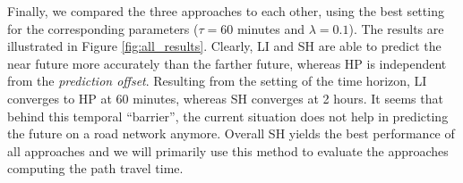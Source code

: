 Finally, we compared the three approaches to each other, using the best setting
for the corresponding parameters ($\tau = 60$ minutes and $\lambda = 0.1$). The
results are illustrated in Figure \ref{fig:all_results}. Clearly, LI and SH are
able to predict the near future more accurately than the farther future, whereas
HP is independent from the \textit{prediction offset}. Resulting from the
setting of the time horizon, LI converges to HP at 60 minutes, whereas SH
converges at 2 hours. It seems that behind this temporal ``barrier'', the
current situation does not help in predicting the future on a road network anymore.
Overall SH yields the best performance of all approaches and we will primarily
use this method to evaluate the approaches computing the path travel
time.

